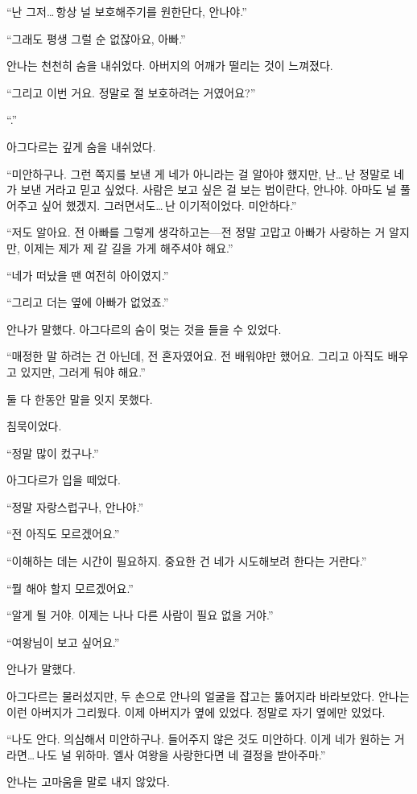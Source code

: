 ``난 그저\ldots\,항상 널 보호해주기를 원한단다, 안나야.''

``그래도 평생 그럴 순 없잖아요, 아빠.''

안나는 천천히 숨을 내쉬었다. 아버지의 어깨가 떨리는 것이 느껴졌다.

``그리고 이번 거요. 정말로 절 보호하려는 거였어요?''

``.''

아그다르는 깊게 숨을 내쉬었다.

``미안하구나. 그런 쪽지를 보낸 게 네가 아니라는 걸 알아야 했지만, 난\ldots\,난 정말로 네가 보낸 거라고 믿고 싶었다. 사람은 보고 싶은 걸 보는 법이란다, 안나야. 아마도 널 풀어주고 싶어 했겠지. 그러면서도\ldots\,난 이기적이었다. 미안하다.''

``저도 알아요. 전 아빠를 그렇게 생각하고는—전 정말 고맙고 아빠가 사랑하는 거 알지만, 이제는 제가 제 갈 길을 가게 해주셔야 해요.''

``네가 떠났을 땐 여전히 아이였지.''

``그리고 더는 옆에 아빠가 없었죠.''

안나가 말했다. 아그다르의 숨이 멎는 것을 들을 수 있었다.

``매정한 말 하려는 건 아닌데, 전 혼자였어요. 전 배워야만 했어요. 그리고 아직도 배우고 있지만, 그러게 둬야 해요.''

둘 다 한동안 말을 잇지 못했다.

 침묵이었다.

``정말 많이 컸구나.''

아그다르가 입을 떼었다.

``정말 자랑스럽구나, 안나야.''

``전 아직도 모르겠어요.''

``이해하는 데는 시간이 필요하지. 중요한 건 네가 시도해보려 한다는 거란다.''

``뭘 해야 할지 모르겠어요.''

``알게 될 거야. 이제는 나나 다른 사람이 필요 없을 거야.''

``여왕님이 보고 싶어요.''

안나가 말했다.

아그다르는 물러섰지만, 두 손으로 안나의 얼굴을 잡고는 뚫어지라 바라보았다. 안나는 이런 아버지가 그리웠다. 이제 아버지가 옆에 있었다. 정말로 자기 옆에만 있었다.

``나도 안다. 의심해서 미안하구나. 들어주지 않은 것도 미안하다. 이게 네가 원하는 거라면\ldots\,나도 널 위하마. 엘사 여왕을 사랑한다면 네 결정을 받아주마.''

안나는 고마움을 말로 내지 않았다.

